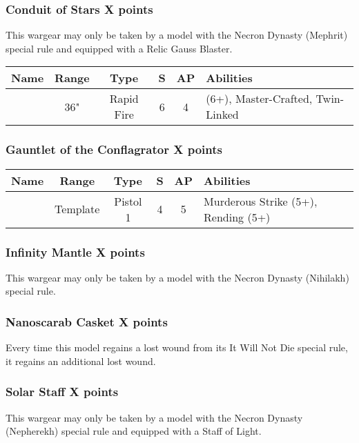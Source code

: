 \subsubsection[Conduit of Stars]{Conduit of Stars \dotfill X points}
This wargear may only be taken by a model with the Necron Dynasty (Mephrit) special rule and equipped with a Relic Gauss Blaster.

\label{Conduit of Stars}
\noindent
\begin{NiceTabular}{m{130 pt} *{4}{c} >{\raggedright\arraybackslash}p{240pt}}
	Name & Range & Type & S & AP & Abilities \\
	\hline
	 & 36" & Rapid Fire & 6 & 4 &  (6+), Master-Crafted, Twin-Linked \\	
\end{NiceTabular}


\subsubsection[Gauntlet of the Conflagrator]{Gauntlet of the Conflagrator \dotfill X points}

\label{Gauntlet of the Conflagrator}
\noindent
\begin{NiceTabular}{m{130 pt} *{4}{c} >{\raggedright\arraybackslash}p{240pt}}
	Name & Range & Type & S & AP & Abilities \\
	\hline
	 & Template & Pistol 1 & 4 & 5 & Murderous Strike (5+), Rending (5+) \\	
\end{NiceTabular}

\subsubsection[Infinity Mantle]{Infinity Mantle \dotfill X points}
This wargear may only be taken by a model with the Necron Dynasty (Nihilakh) special rule.

\subsubsection[Nanoscarab Casket]{Nanoscarab Casket \dotfill X points}

Every time this model regains a lost wound from its It Will Not Die special rule, it regains an additional lost wound.

\subsubsection[Solar Staff]{Solar Staff \dotfill X points}
This wargear may only be taken by a model with the Necron Dynasty (Nepherekh) special rule and equipped with a Staff of Light.

